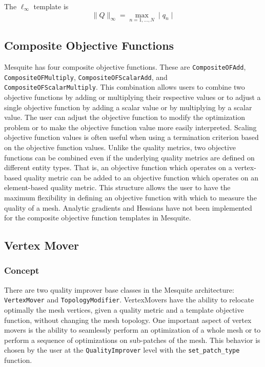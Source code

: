  \newline
The $\ell_{\infty}$ template is
\begin{equation}
\| Q \|_{\infty} = \max_{n=1,\ldots,N} \mid q_n \mid
\end{equation}


\subsection{Composite Objective Functions}

Mesquite has four composite objective functions.  These are
\texttt{CompositeOFAdd}, \texttt{CompositeOFMultiply}, \texttt{CompositeOFScalarAdd}, and
\texttt{CompositeOFScalarMultiply}.  This combination allows users
to combine two objective functions by adding or multiplying
their respective values or to adjust a single objective function
by adding a scalar value or by multiplying by a scalar value.  
The user can adjust the objective function to modify the
optimization problem or to make the objective function value
more easily interpreted.  Scaling objective function values
is often useful when using a termination criterion based on the
objective function values. Unlike the quality metrics, 
two objective functions can be combined
even if the underlying quality metrics are defined on different entity
types.  That is, an objective function which operates on a vertex-based
quality metric can be added to an objective function which operates
on an element-based quality metric.  This structure allows the user
to have the maximum flexibility in defining an objective function with
which to measure the quality of a mesh.  Analytic gradients and
Hessians have not been implemented for the composite objective
function templates in Mesquite.


\subsection{Vertex Mover} \label{sec:VertexMover}

\subsubsection{Concept}
There are two quality improver base classes in the Mesquite architecture: \texttt{VertexMover} and
\texttt{TopologyModifier}. VertexMovers have the ability to relocate optimally the mesh vertices,
given a quality metric and a template objective function, without changing the mesh topology.
One important aspect of vertex movers is
the ability to seamlessly perform an optimization of a whole mesh or
to perform a sequence of optimizations on sub-patches of the mesh.
This behavior is chosen by the user at the \texttt{QualityImprover}
level with the \texttt{set\_patch\_type} function. 

